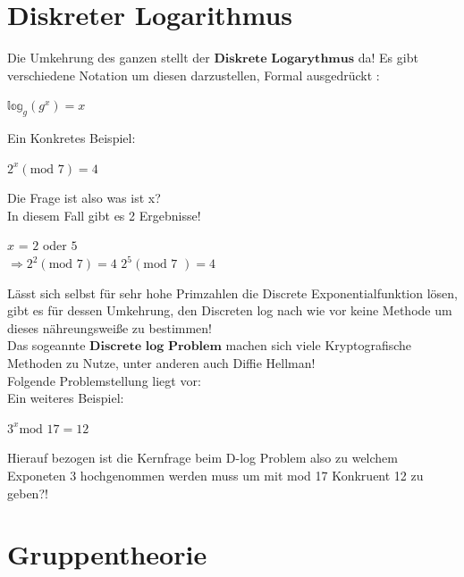 \documentclass[a4paper,12pt]{scrartcl}
\begin{document}
\section{Diskreter Logarithmus}
Die Umkehrung des ganzen stellt der $\textbf{Diskrete Logarythmus}$ da! Es gibt verschiedene Notation um diesen darzustellen, Formal ausgedrückt :\\

\begin{center}
$\mathbb{\text{log}}_{g}(g^x)=x$

\end{center}

Ein Konkretes Beispiel:
\begin{center}
 $2^x (\text{mod 7} ) = 4$
\end{center}
Die Frage ist also was ist x?\\
In diesem Fall gibt es 2 Ergebnisse!
\begin{center}
 $x$ = $2$ oder $5$\\
 $\Rightarrow 2^2 (\text{mod 7}) = 4$ \text{       } $2^5 (\text{mod 7 }) = 4$
\end{center}


Lässt sich selbst für sehr hohe Primzahlen die Discrete Exponentialfunktion lösen, gibt es für dessen Umkehrung, den Discreten log nach wie vor keine Methode um dieses nähreungsweiße zu bestimmen!\\
Das sogeannte $\textbf{Discrete log Problem}$ machen sich viele Kryptografische Methoden zu Nutze, unter anderen auch Diffie Hellman!\\
Folgende Problemstellung liegt vor: \\Ein weiteres Beispiel:
\begin{center}
 $3^x \text{mod 17} = 12$
 
\end{center}
Hierauf bezogen ist die Kernfrage beim D-log Problem also zu welchem Exponeten 3 hochgenommen werden muss um mit mod 17 Konkruent 12 zu geben?!
\begin{center}
 
\end{center}



\section{Gruppentheorie}
\end{document}
